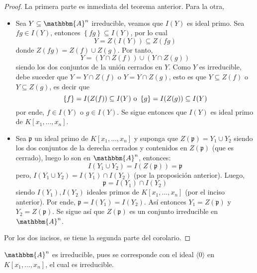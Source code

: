 \documentclass[12pt]{report}
\theoremstyle{largebreak}
\newcommand{\bbm}[1]{\ensuremath{\mathbbm{#1}}}
\newcommand{\fk}[1]{\ensuremath{\mathfrak{#1}}}
\newcommand{\gen}[1]{\ensuremath{\langle#1\rangle}}
\begin{document}
    \begin{proof}
        La primera parte es inmediata del teorema anterior. Para la otra,
        \begin{itemize}
            \item Sea $Y\subseteq\bbm{A}^n$ irreducible, veamos que $I(Y)$ es ideal primo. Sea $fg\in I(Y)$, entonces $\left\{fg \right\}\subseteq I(Y)$, por lo cual
            \begin{equation*}
                Y=Z(I(Y))\subseteq Z(fg)
            \end{equation*}
            donde $Z(fg)=Z(f)\cup Z(g)$. Por tanto,
            \begin{equation*}
                Y=(Y\cap Z(f))\cup (Y\cap Z(g))
            \end{equation*}
            siendo los dos conjuntos de la unión cerrados en $Y$. Como $Y$ es irreducible, debe suceder que $Y=Y\cap Z(f)$ o $Y=Y\cap Z(g)$, esto es que $Y\subseteq Z(f)$ o $Y\subseteq Z(g)$, es decir que
            \begin{equation*}
                \left\{f \right\}=I(Z(f))\subseteq I(Y)\textup{ o }\left\{g \right\}=I(Z(g))\subseteq I(Y)
            \end{equation*}
            por ende, $f\in I(Y)$ o $g\in I(Y)$. Se sigue entonces que $I(Y)$ es ideal primo de $K[x_1,...,x_n]$.
            \item Sea $\fk{p}$ un ideal primo de $K[x_1,...,x_n]$ y suponga que $Z(\fk{p})=Y_1\cup Y_2$ siendo los dos conjuntos de la derecha cerrados y contenidos en $Z(\fk{p})$ (que es cerrado), luego lo son en $\bbm{A}^n$, entonces:
            \begin{equation*}
                I(Y_1\cup Y_2)=I(Z(\fk{p}))=\fk{p}
            \end{equation*}
            pero, $I(Y_1\cup Y_2)=I(Y_1)\cap I(Y_2)$ (por la proposición anterior). Luego,
            \begin{equation*}
                \fk{p}=I(Y_1)\cap I(Y_2)
            \end{equation*}
            siendo $I(Y_1),I(Y_2)$ ideales primos de $K[x_1,...,x_n]$ (por el inciso anterior). Por ende, $\fk{p}=I(Y_1)=I(Y_2)$. Así entonces $Y_1=Z(\fk{p})$ y $Y_2=Z(\fk{p})$. Se sigue así que $Z(\fk{p})$ es un conjunto irreducible en $\bbm{A}^n$.
        \end{itemize}
        Por los dos incisos, se tiene la segunda parte del corolario.
    \end{proof}

    \begin{exa}
        $\bbm{A}^n$ es irreducible, pues se corresponde con el ideal $\gen{0}$ en $K[x_1,...,x_n]$, el cual es irreducible.
    \end{exa}
\end{document}
